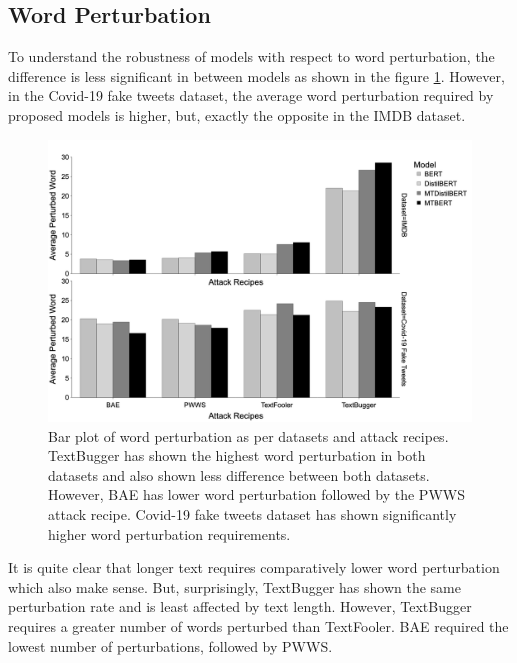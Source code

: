 \documentclass[%
	BCOR=8mm, %
	DIV=12,
	toc=bibliography, %
	toc=listof, %
	oneside, %
	egregdoesnotlikesansseriftitles, %
	]{scrbook}
\begin{document}
\subsection{Word Perturbation}
To understand the robustness of models with respect to word perturbation, the difference is less significant in between models as shown in the figure \ref{fig:avgpertbyattackrecipes}. However, in the Covid-19 fake tweets dataset, the average word perturbation required by proposed models is higher, but, exactly the opposite in the IMDB dataset.
\begin{figure}[H]
    \centering
     \hspace*{2.5em}
    \includegraphics[width=0.9\linewidth]{img/AvgPertByDataset}
    \caption[Bar plot of word perturbation rate]{Bar plot of word perturbation as per datasets and attack recipes. TextBugger has shown the highest word perturbation in both datasets and also shown less difference between both datasets. However, BAE has lower word perturbation followed by the PWWS attack recipe. Covid-19 fake tweets dataset has shown significantly higher word perturbation requirements.  }
    \label{fig:avgpertbyattackrecipes}
\end{figure}
 It is quite clear that longer text requires comparatively lower  word perturbation which also make sense. But, surprisingly, TextBugger has shown the same perturbation rate and is least affected by text length. However,  TextBugger requires a greater number of words perturbed than TextFooler. BAE required the lowest number of perturbations, followed by PWWS.
\end{document}
